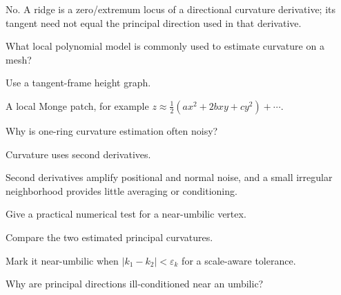 \begin{solution}
No.  A ridge is a zero/extremum locus of a directional curvature derivative; its tangent need not equal the principal direction used in that derivative.
\end{solution}

\begin{exercise}\label{exr:vii42-15}
What local polynomial model is commonly used to estimate curvature on a mesh?
\end{exercise}

\begin{hint}
Use a tangent-frame height graph.
\end{hint}

\begin{solution}
A local Monge patch, for example \(z\approx\frac12(ax^2+2bxy+cy^2)+\cdots\).
\end{solution}

\begin{exercise}\label{exr:vii42-16}
Why is one-ring curvature estimation often noisy?
\end{exercise}

\begin{hint}
Curvature uses second derivatives.
\end{hint}

\begin{solution}
Second derivatives amplify positional and normal noise, and a small irregular neighborhood provides little averaging or conditioning.
\end{solution}

\begin{exercise}\label{exr:vii42-17}
Give a practical numerical test for a near-umbilic vertex.
\end{exercise}

\begin{hint}
Compare the two estimated principal curvatures.
\end{hint}

\begin{solution}
Mark it near-umbilic when \(|k_1-k_2|<\varepsilon_k\) for a scale-aware tolerance.
\end{solution}

\begin{exercise}\label{exr:vii42-18}
Why are principal directions ill-conditioned near an umbilic?
\end{exercise}

